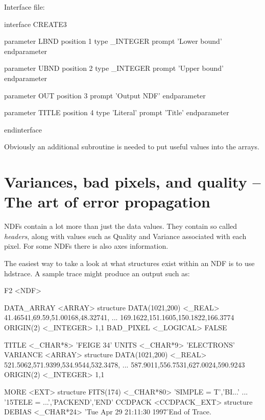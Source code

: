 \documentclass[11pt,nolof]{starlink}
\begin{document}
Interface file:

\begin{small}
\begin{terminalv}
interface CREATE3

  parameter LBND
    position 1
    type _INTEGER
    prompt 'Lower bound'
  endparameter

  parameter UBND
    position 2
    type _INTEGER
    prompt 'Upper bound'
  endparameter

  parameter OUT
    position 3
    prompt 'Output NDF'
  endparameter

  parameter TITLE
    position 4
    type 'Literal'
    prompt 'Title'
  endparameter

endinterface
\end{terminalv}
\end{small}


Obviously an additional subroutine is needed to put useful values into
the arrays.

\section{Variances, bad pixels, and quality -- The art of error propagation}

NDFs contain a lot more than just the data values. They contain so called
\emph{headers}, along with values such as Quality and Variance associated with
each pixel. For some NDFs there is also axes information.

The easiest way to take a look at what structures exist within an
NDF is to use \textsf{hdstrace}.
A sample trace might produce an output such as:

\begin{small}
\begin{terminalv}
F2  <NDF>

   DATA_ARRAY     <ARRAY>         {structure}
      DATA(1021,200)  <_REAL>        41.46541,69.59,51.00168,48.32741,
                                     ... 169.1622,151.1605,150.1822,166.3774
      ORIGIN(2)      <_INTEGER>      1,1
      BAD_PIXEL      <_LOGICAL>      FALSE

   TITLE          <_CHAR*8>       'FEIGE 34'
   UNITS          <_CHAR*9>       'ELECTRONS'
   VARIANCE       <ARRAY>         {structure}
      DATA(1021,200)  <_REAL>        521.5062,571.9399,534.9544,532.3478,
                                     ... 587.9011,556.7531,627.0024,590.9243
      ORIGIN(2)      <_INTEGER>      1,1

   MORE           <EXT>           {structure}
      FITS(174)      <_CHAR*80>      'SIMPLE  =                    T','BI...'
                                     ... '15TELE  =
...','PACKEND','END'
      CCDPACK        <CCDPACK_EXT>   {structure}
         DEBIAS         <_CHAR*24>      'Tue Apr 29 21:11:30 1997'End of
Trace.
\end{terminalv}
\end{small}
\end{document}
